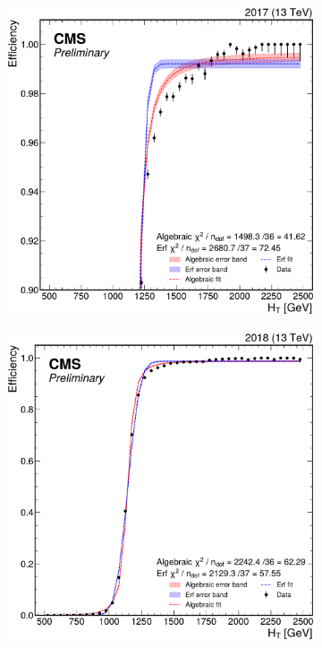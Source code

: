 \begin{figure}
\begin{subfigure}{.36\linewidth}
	\end{subfigure}%
	\begin{subfigure}{.36\linewidth}
		\includegraphics[width=\linewidth]{Images/pdfs/fits_closeup_17.pdf}
	\end{subfigure}
	\begin{subfigure}{.36\linewidth}
		\includegraphics[width=\linewidth]{Images/pdfs/fits_18.pdf}

\end{subfigure}
\end{figure}
